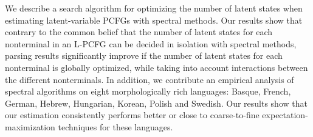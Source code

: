 We describe a search algorithm for optimizing the number of latent states when estimating latent-variable PCFGs with spectral methods. Our results show that contrary to the common belief that the number of latent states for each nonterminal in an L-PCFG can be decided in isolation with spectral methods, parsing results significantly improve if the number of latent states for each nonterminal is globally optimized, while taking into account interactions between the different nonterminals. In addition, we contribute an empirical analysis of spectral algorithms on eight morphologically rich languages: Basque, French, German, Hebrew, Hungarian, Korean, Polish and Swedish. Our results show that our estimation consistently performs better or close to coarse-to-fine expectation-maximization techniques for these languages.

